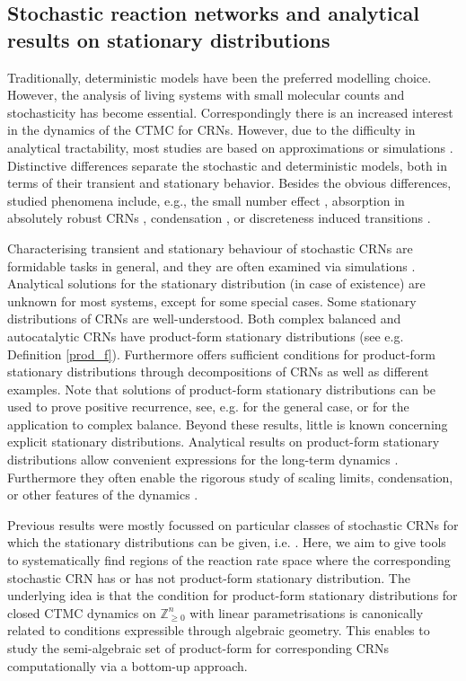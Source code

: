 \documentclass{amsart}
\theoremstyle{definition}
\theoremstyle{remark}
\theoremstyle{Conjecture/open problem}
\theoremstyle{assumption}
\theoremstyle{conjecture}
\def\Z{\mathbb{Z}}
\numberwithin{equation}{section}
\begin{document}
 


\subsection{Stochastic reaction networks and analytical results on stationary distributions}
Traditionally, deterministic models
have been the preferred modelling choice. However, 
the analysis of living systems with small molecular counts and stochasticity has become essential. Correspondingly there is an increased interest in the dynamics of the CTMC for CRNs. 
However, due to the difficulty in analytical tractability, most studies are based on approximations or simulations \cite{gardiner,Saito1,Saito2,gillespieb}. Distinctive differences separate the stochastic and deterministic models, both in terms of their transient and stationary behavior. Besides the obvious differences, studied phenomena include, e.g., the small number effect \cite{Saito1}, absorption in absolutely robust CRNs \cite{Anderson14}, condensation \cite{hoesslysta}, or discreteness induced transitions \cite{Saito2}. 

Characterising transient and stationary behaviour of stochastic CRNs are \\
formidable tasks in general, and they are often examined via simulations \cite{gillespieb}. 
Analytical solutions for the stationary distribution (in case of existence) are unknown for most systems, except for some special cases. Some stationary distributions of CRNs are well-understood. Both complex balanced  \cite{anderson2} and autocatalytic CRNs  \cite{hoesslysta} have product-form stationary distributions (see e.g. Definition \ref{prod_f}).
Furthermore \cite{hoesslyuni} offers sufficient conditions for product-form stationary distributions through decompositions of CRNs as well as different examples. Note that solutions  of product-form stationary distributions can be used to prove positive recurrence, see, e.g. \cite[II, Corollary 4.4]{asmussen2003applied} for the general case, or \cite{non-expl} for the application to complex balance. 
Beyond these results, little is known concerning explicit stationary distributions. Analytical results on product-form stationary distributions allow convenient expressions for the long-term dynamics \cite{anderson2,hoesslyuni,liggett,Schadschn_cx,serfozo}. Furthermore they often enable the rigorous study of scaling limits, condensation, or other features of the dynamics \cite{hoesslysta,Cao2,kipnis1999sli}.

Previous results were mostly focussed on particular classes of stochastic CRNs for which the stationary distributions can be given, i.e. \cite{anderson2,non-stand_2,hoesslysta,hoesslyuni}. Here, we aim to give tools to systematically find regions of the reaction rate space 
where the corresponding stochastic CRN has or has not product-form stationary distribution. The underlying idea is that the condition for product-form stationary distributions for closed CTMC dynamics on $\Z_{\geq 0}^n$ with linear parametrisations is canonically related to conditions expressible through algebraic geometry.  This enables to study the semi-algebraic set of product-form for corresponding CRNs computationally via a bottom-up approach.
\end{document}
